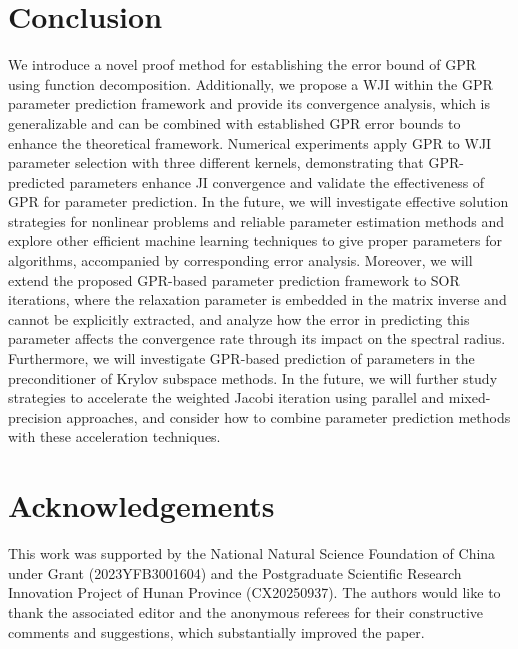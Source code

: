 \documentclass[preprint,review,sort&compress,3p]{elsarticle}
\begin{document}
\section{Conclusion}
\label{Conclusion} 



We introduce a novel proof method for establishing the error bound of GPR using function decomposition. Additionally, we propose a WJI within the GPR parameter prediction framework and provide its convergence analysis, which is generalizable and can be combined with established GPR error bounds to enhance the theoretical framework. Numerical experiments apply GPR to WJI parameter selection with three different kernels, demonstrating that GPR-predicted parameters enhance JI convergence and validate the effectiveness of GPR for parameter prediction. In the future, we will investigate effective solution strategies for nonlinear problems and reliable parameter estimation methods and explore other efficient machine learning techniques to give proper parameters for algorithms, accompanied by corresponding error analysis. {  
Moreover, we will extend the proposed GPR-based parameter prediction framework to SOR iterations, where the relaxation parameter is embedded in the matrix inverse and cannot be explicitly extracted, and analyze how the error in predicting this parameter affects the convergence rate through its impact on the spectral radius.
Furthermore, we will investigate GPR-based prediction of parameters in the preconditioner of Krylov subspace methods. In the future, we will further study strategies to accelerate the weighted Jacobi iteration using parallel and mixed-precision approaches, and consider how to combine parameter prediction methods with these acceleration techniques.}

 


\section*{Acknowledgements}
	This work was supported by the National Natural Science Foundation of China under Grant (2023YFB3001604) and {  the Postgraduate Scientific Research Innovation Project of Hunan Province (CX20250937).}
	{ The authors would like to thank the associated editor and the anonymous referees for their constructive comments and suggestions, which substantially improved the paper.}
	
\end{document}
